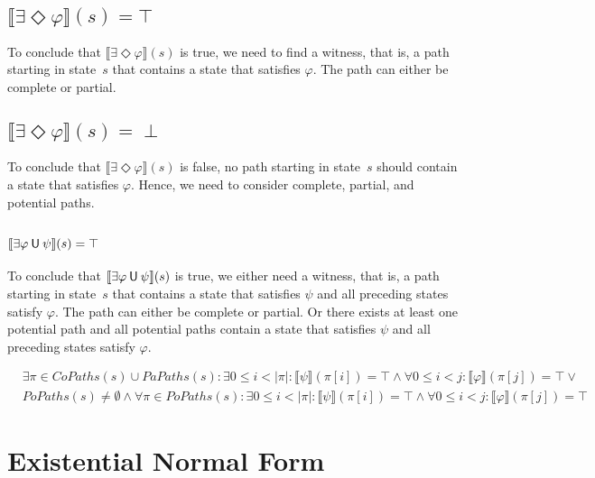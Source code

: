 \documentclass[12pt]{article}
\newcommand{\eventually}{\Diamond}
\newcommand{\until}{\mathbin{\sf U}}
\theoremstyle{definition}
\newcommand{\satisfaction}[1]{\llbracket #1 \rrbracket}
\newenvironment{franck}{\color{red}}{\color{black}}
\begin{document}
\subsection*{$\satisfaction{\exists \eventually \varphi}(s) = \top$}

To conclude that $\satisfaction{\exists \eventually \varphi}(s)$ is true, we need to find a witness, that is, a path starting in state~$s$ that contains a state that satisfies $\varphi$.  The path can either be complete or partial.

\subsection*{$\satisfaction{\exists \eventually \varphi}(s) = \perp$}

To conclude that $\satisfaction{\exists \eventually \varphi}(s)$ is false, no path starting in state~$s$ should contain a state that satisfies $\varphi$.  Hence, we need to consider complete, partial, and potential paths.

\begin{franck}
\subsection*{$\satisfaction{\exists \varphi \until \psi}(s) = \top$}

To conclude that $\satisfaction{\exists \varphi \until \psi}(s)$ is true, we either need a witness, that is, a path starting in state~$s$ that contains a state that satisfies $\psi$ and all preceding states satisfy $\varphi$.  The path can either be complete or partial.  Or there exists at least one potential path and all potential paths contain a state that satisfies $\psi$ and all preceding states satisfy $\varphi$.

\begin{align*}
& \exists \pi \in \mathit{CoPaths}(s) \cup \mathit{PaPaths}(s) : \exists 0 \leq i < |\pi| : \satisfaction{\psi}(\pi[i]) = \top \wedge \forall 0 \leq i < j : \satisfaction{\varphi}(\pi[j]) = \top \vee\\
& \mathit{PoPaths}(s) \not= \emptyset \wedge \forall \pi \in \mathit{PoPaths}(s) : \exists 0 \leq i < |\pi| : \satisfaction{\psi}(\pi[i]) = \top \wedge \forall 0 \leq i < j : \satisfaction{\varphi}(\pi[j]) = \top
\end{align*}

\end{franck}

\section{Existential Normal Form}
\end{document}
